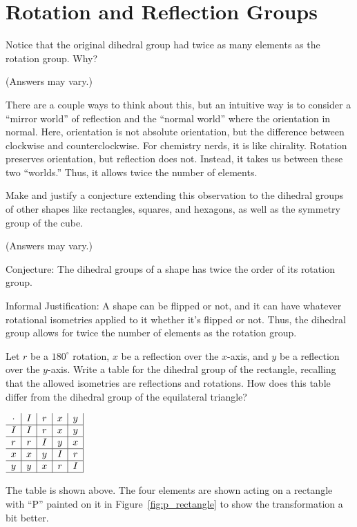 \documentclass[../gatm_answers.tex]{subfiles}
\begin{document}
\section{Rotation and Reflection Groups}

\begin{outer_problem}[start=1]
\item Notice that the original dihedral group had twice as many elements as the rotation group. Why?
\end{outer_problem}

(Answers may vary.)

There are a couple ways to think about this, but an intuitive way is to consider a ``mirror world'' of reflection and the ``normal world'' where the orientation in normal. Here, orientation is not absolute orientation, but the difference between clockwise and counterclockwise. For chemistry nerds, it is like chirality. Rotation preserves orientation, but reflection does not. Instead, it takes us between these two ``worlds.'' Thus, it allows twice the number of elements.

\begin{outer_problem}
\item Make and justify a conjecture extending this observation to the dihedral groups of other shapes like rectangles, squares, and hexagons, as well as the symmetry group of the cube.
\end{outer_problem}

(Answers may vary.)

Conjecture: The dihedral groups of a shape has twice the order of its rotation group.

Informal Justification: A shape can be flipped or not, and it can have whatever rotational isometries applied to it whether it's flipped or not. Thus, the dihedral group allows for twice the number of elements as the rotation group.

\begin{outer_problem}
\item Let $r$ be a $180^{\circ}$ rotation, $x$ be a reflection over the $x$-axis, and $y$ be a reflection over the $y$-axis. Write a table for the dihedral group of the rectangle, recalling that the allowed isometries are reflections and rotations. How does this table differ from the dihedral group of the equilateral triangle? \label{prob:rectangle_group}
\end{outer_problem}

\begin{center}
$\begin{array}{c|c|c|c|c|}
\cdot & I & r & x & y \\ \hline
I & I & r & x & y \\ \hline
r & r & I & y & x \\ \hline
x & x & y & I & r \\ \hline
y & y & x & r & I \\ \hline
\end{array}$
\end{center}
The table is shown above. The four elements are shown acting on a rectangle with ``P'' painted on it in Figure~\ref{fig:p_rectangle} to show the transformation a bit better.
\end{document}
